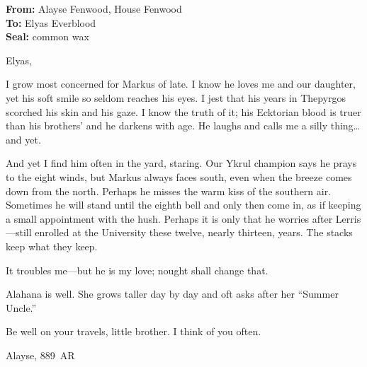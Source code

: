 \documentclass[11pt]{article}
\numberwithin{equation}{section} %
\theoremstyle{plain} %
\theoremstyle{definition} %
\theoremstyle{remark} %
\begin{document}
\noindent\textbf{From:} Alayse Fenwood, House Fenwood \\
\textbf{To:} Elyas Everblood \\
\textbf{Seal:} common wax

\medskip
\noindent Elyas,

I grow most concerned for Markus of late. I know he loves me and our daughter, yet his soft smile so seldom reaches his eyes. I jest that his years in Thepyrgos scorched his skin and his gaze. I know the truth of it; his Ecktorian blood is truer than his brothers’ and he darkens with age. He laughs and calls me a silly thing\ldots{} and yet.

And yet I find him often in the yard, staring. Our Ykrul champion says he prays to the eight winds, but Markus always faces south, even when the breeze comes down from the north. Perhaps he misses the warm kiss of the southern air. Sometimes he will stand until the eighth bell and only then come in, as if keeping a small appointment with the hush. Perhaps it is only that he worries after Lerris---still enrolled at the University these twelve, nearly thirteen, years. The stacks keep what they keep.

It troubles me---but he is my love; nought shall change that.

Alahana is well. She grows taller day by day and oft asks after her ``Summer Uncle.''

Be well on your travels, little brother. I think of you often.

\medskip
\noindent Alayse, 889~AR
\end{document}
